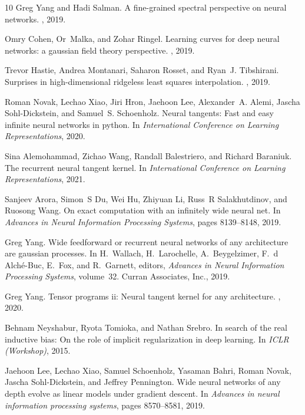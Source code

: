\documentclass[11pt]{article}
\begin{document}
\begin{thebibliography}{10}
Greg Yang and Hadi Salman.
\newblock A fine-grained spectral perspective on neural networks.
, 2019.

Omry Cohen, Or~Malka, and Zohar Ringel.
\newblock Learning curves for deep neural networks: a gaussian field theory
  perspective.
, 2019.

Trevor Hastie, Andrea Montanari, Saharon Rosset, and Ryan~J. Tibshirani.
\newblock Surprises in high-dimensional ridgeless least squares interpolation.
, 2019.

Roman Novak, Lechao Xiao, Jiri Hron, Jaehoon Lee, Alexander~A. Alemi, Jascha
  Sohl-Dickstein, and Samuel~S. Schoenholz.
\newblock Neural tangents: Fast and easy infinite neural networks in python.
\newblock In {\em International Conference on Learning Representations}, 2020.

Sina Alemohammad, Zichao Wang, Randall Balestriero, and Richard Baraniuk.
\newblock The recurrent neural tangent kernel.
\newblock In {\em International Conference on Learning Representations}, 2021.

Sanjeev Arora, Simon~S Du, Wei Hu, Zhiyuan Li, Russ~R Salakhutdinov, and
  Ruosong Wang.
\newblock On exact computation with an infinitely wide neural net.
\newblock In {\em Advances in Neural Information Processing Systems}, pages
  8139--8148, 2019.

Greg Yang.
\newblock Wide feedforward or recurrent neural networks of any architecture are
  gaussian processes.
\newblock In H.~Wallach, H.~Larochelle, A.~Beygelzimer, F.~d\textquotesingle
  Alch\'{e}-Buc, E.~Fox, and R.~Garnett, editors, {\em Advances in Neural
  Information Processing Systems}, volume~32. Curran Associates, Inc., 2019.

Greg Yang.
\newblock Tensor programs ii: Neural tangent kernel for any architecture.
, 2020.

Behnam Neyshabur, Ryota Tomioka, and Nathan Srebro.
\newblock In search of the real inductive bias: On the role of implicit
  regularization in deep learning.
\newblock In {\em ICLR (Workshop)}, 2015.

Jaehoon Lee, Lechao Xiao, Samuel Schoenholz, Yasaman Bahri, Roman Novak, Jascha
  Sohl-Dickstein, and Jeffrey Pennington.
\newblock Wide neural networks of any depth evolve as linear models under
  gradient descent.
\newblock In {\em Advances in neural information processing systems}, pages
  8570--8581, 2019.


\end{thebibliography}
\end{document}
